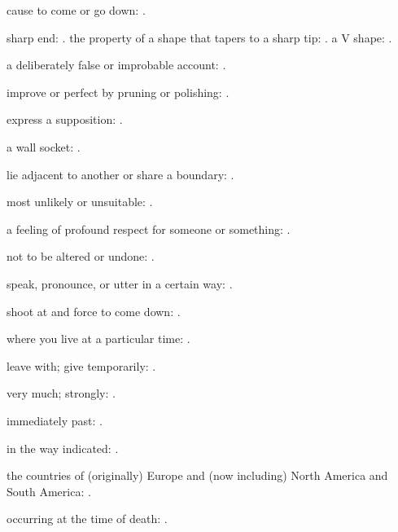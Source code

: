   cause to come or go down:   .

  sharp end: . the property of a shape that tapers to a sharp tip:   . a V shape:   .

  a deliberately false or improbable account: .

  improve or perfect by pruning or polishing:   .

  express a supposition:   .

  a wall socket:   .

  lie adjacent to another or share a boundary:   .

  most unlikely or unsuitable: .

  a feeling of profound respect for someone or something:   .

  not to be altered or undone:   .

  speak, pronounce, or utter in a certain way:   .

  shoot at and force to come down:   .

  where you live at a particular time:   .

  leave with; give temporarily: .

  very much; strongly:   .

  immediately past: .

  in the way indicated:   .

  the countries of (originally) Europe and (now including) North America and South America:   .

  occurring at the time of death: .

